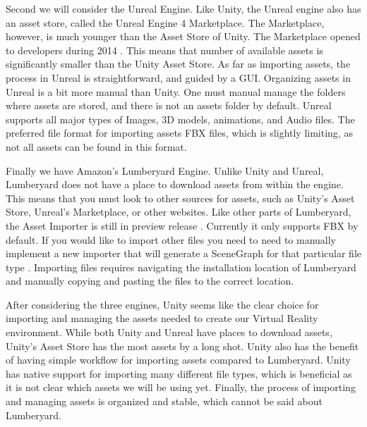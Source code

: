 \documentclass[10pt,journal,compsoc,onecolumn, draftclsnofoot]{IEEEtran}
\begin{document}
\begin{bibunit}
Second we will consider the Unreal Engine.
Like Unity, the Unreal engine also has an asset store, called the Unreal Engine 4 Marketplace.
The Marketplace, however, is much younger than the Asset Store of Unity.
The Marketplace opened to developers during 2014 \cite{unreal_marketplace_date}.
This means that number of available assets is significantly smaller than the Unity Asset Store.
As far as importing assets, the process in Unreal is straightforward, and guided by a GUI.
Organizing assets in Unreal is a bit more manual than Unity.
One must manual manage the folders where assets are stored, and there is not an assets folder by default.
Unreal supports all major types of Images, 3D models, animations, and Audio files.
The preferred file format for importing assets FBX files, which is slightly limiting, as not all assets can be found in this format.

Finally we have Amazon's Lumberyard Engine.
Unlike Unity and Unreal, Lumberyard does not have a place to download assets from within the engine.
This means that you must look to other sources for assets, such as Unity's Asset Store, Unreal's Marketplace, or other websites.
Like other parts of Lumberyard, the Asset Importer is still in preview release \cite{lumberyard_asset_import}.
Currently it only supports FBX by default.
If you would like to import other files you need to need to manually implement a new importer that will generate a SceneGraph for that particular file type \cite{lumberyard_asset_import}.
Importing files requires navigating the installation location of Lumberyard and manually copying and pasting the files to the correct location.

After considering the three engines, Unity seems like the clear choice for importing and managing the assets needed to create our Virtual Reality environment.
While both Unity and Unreal have places to download assets, Unity's Asset Store has the most assets by a long shot.
Unity also has the benefit of having simple workflow for importing assets compared to Lumberyard.
Unity has native support for importing many different file types, which is beneficial as it is not clear which assets we will be using yet.
Finally, the process of importing and managing assets is organized and stable, which cannot be said about Lumberyard.


\end{bibunit}
\end{document}
